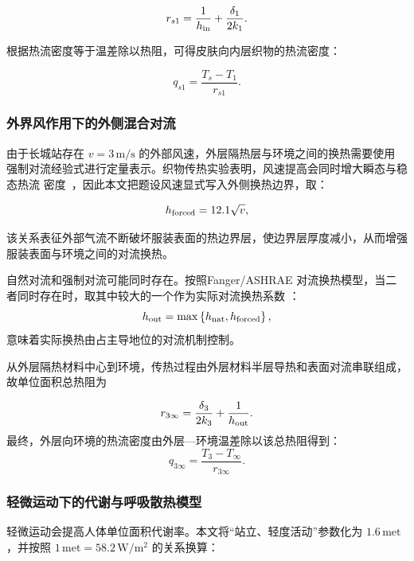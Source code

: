 \documentclass[withoutpreface,bwprint]{cumcmthesis}
\begin{document}
\begin{equation}
r_{s1}=\frac{1}{h_{\rm in}}+\frac{\delta_1}{2k_1}.
\end{equation}

根据热流密度等于温差除以热阻，可得皮肤向内层织物的热流密度：

\begin{equation}
q_{s1}=\frac{T_s-T_1}{r_{s1}}.
\end{equation}

\subsubsection{外界风作用下的外侧混合对流}
由于长城站存在 $v=3\,\mathrm{m/s}$ 的外部风速，外层隔热层与环境之间的换热需要使用
强制对流经验式进行定量表示。织物传热实验表明，风速提高会同时增大瞬态与稳态热流
密度~\cite{liu2024windfabric}，因此本文把题设风速显式写入外侧换热边界，取：

\begin{equation}
h_{\rm forced}=12.1\sqrt v,
\end{equation}

该关系表征外部气流不断破坏服装表面的热边界层，使边界层厚度减小，从而增强服装表面与环境之间的对流换热。

自然对流和强制对流可能同时存在。按照Fanger/ASHRAE 对流换热模型，当二者同时存在时，取其中较大的一个作为实际对流换热系数 ：
\begin{equation}
h_{\rm out}=\max\left\{h_{\rm nat},h_{\rm forced}\right\},
\end{equation}
意味着实际换热由占主导地位的对流机制控制。

从外层隔热材料中心到环境，传热过程由外层材料半层导热和表面对流串联组成，故单位面积总热阻为

\begin{equation}
r_{3\infty}=\frac{\delta_3}{2k_3}+\frac{1}{h_{\rm out}}.
\end{equation}
最终，外层向环境的热流密度由外层—环境温差除以该总热阻得到：
\begin{equation}
q_{3\infty}=\frac{T_3-T_\infty}{r_{3\infty}}.
\end{equation}

\subsubsection{轻微运动下的代谢与呼吸散热模型}
轻微运动会提高人体单位面积代谢率。本文将“站立、轻度活动”参数化为
$1.6\,\mathrm{met}$，并按照 $1\,\mathrm{met}=58.2\,\mathrm{W/m^2}$ 的关系换算：
\end{document}
